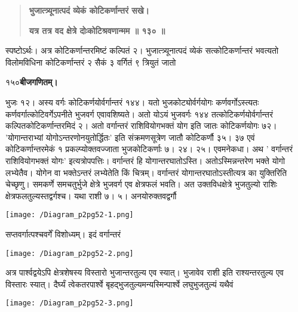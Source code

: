 \documentclass[11pt, openany]{book}
\begin{document}
\begin{sloppypar}
\begin{quote}
\hspace{1in}\textbf{भुजात्त्र्यूनात्पदं व्येकं कोटिकर्णान्तरं सखे।}

\hspace{1in}\textbf{यत्र तत्र वद क्षेत्रे दोःकोटिश्रवणान्मम ॥ १३० ॥}
\end{quote}

\hangindent=0.2in \hspace{0.2in}स्पष्टोऽर्थः। अत्र कोटिकर्णान्तरमिष्टं कल्पितं २। भुजात्त्र्यूनात्पदं व्येकं सत्कोटिकर्णान्तरं भवत्यतो विलोमविधिना कोटिकर्णान्तरं २ सैकं ३ वर्गितं ९ त्रियुतं जातो
\end{sloppypar}
\thispagestyle{empty}
\newpage

\onehalfspacing
१५०\hspace{2in}\textbf{बीजगणितम्।} 

\vspace{5mm}

\begin{sloppypar}
\hangindent=0.2in भुजः १२। अस्य वर्गः कोटिकर्णयोर्वर्गान्तरं १४४। यतो भुजकोट्योर्वर्गयोगः कर्णवर्गोऽस्त्यतः कर्णवर्गात्कोटिवर्गेऽपनीते भुजवर्ग एवावशिष्यते। अतो योऽयं भुजवर्गः १४४ तत्कोटिकर्णयोर्वर्गान्तरं कल्पितकोटिकर्णान्तरमिदं २। अतो वर्गान्तरं राशिवियोगभक्तं योग इति जातः कोटिकर्णयोगः ७२। 'योगान्तराभ्यां योगोऽन्तरणोनयुतोर्द्धितः' इति संक्रमणसूत्रेण जातौ कोटिकर्णौ ३५। ३७ एवं कोटिकर्णान्तरमेकं १ प्रकल्प्योक्तवज्जाता भुजकोटिकर्णाः ७। २४। २५। एवमनेकधा। अथ ' वर्गान्तरं राशिवियोगभक्तं योगः' इत्यत्रोपपत्तिः। वर्गान्तरं हि योगान्तरघातोऽस्ति। अतोऽस्मिन्नन्तरेण भक्ते योगो लभ्येतैव। योगेन वा भक्तेऽन्तरं लभ्येतेति किं चित्रम्। वर्गान्तरं योगान्तरघातोऽस्तीत्यत्र का युक्तिरिति चेच्छृणु। समकर्णे समचतुर्भुजे क्षेत्रे भुजवर्ग एव क्षेत्रफलं भवति। अत उक्तविधक्षेत्रे भुजतुल्यो राशिः क्षेत्रफलतुल्यस्तद्वर्गश्च। यथा राशी ७। ५। अनयोरुक्तवद्वर्गौ

\begin{center}
    \texttt{[image: /Diagram\_p2pg52-1.png]}
\end{center}

\hangindent=0.2in सप्तवर्गात्पश्चवर्गें विशोध्यम्। इदं वर्गान्तरं

\begin{center}
    \texttt{[image: /Diagram\_p2pg52-2.png]}
\end{center}

\hangindent=0.2in अत्र पार्श्वद्वयेऽपि क्षेत्रशेषस्य विस्तारो भुजान्तरतुल्य एव स्यात्। भुजावेव राशी इति राश्यन्तरतुल्य एव विस्तारः स्यात्। दैर्घ्यं त्वेकतरपार्श्वे बृहद्भुजतुल्यमन्यस्मिन्पार्श्वे लघुभुजतुल्यं यथैवं
\begin{center}
    \texttt{[image: /Diagram\_p2pg52-3.png]}
\end{center}
\end{sloppypar}
\thispagestyle{empty}
\newpage
\end{document}
